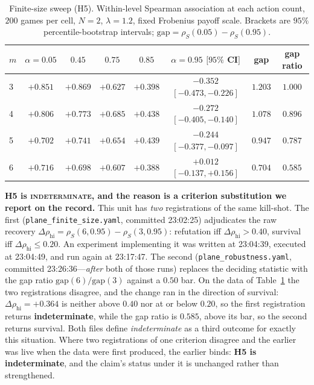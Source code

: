 \begin{table}[H]
\caption{Finite-size sweep (H5). Within-level Spearman association at each action count,
$200$ games per cell, $N=2$, $\lambda=1.2$, fixed Frobenius payoff scale. Brackets are
$95\%$ percentile-bootstrap intervals; $\mathrm{gap}=\rho_S(0.05)-\rho_S(0.95)$.}
\label{tab:finitesize}
\small
\begin{tabular}{lccccccc}
\toprule
$m$ & $\alpha{=}0.05$ & $0.45$ & $0.75$ & $0.85$ & $\alpha{=}0.95$ $[95\%$ CI$]$ & gap & gap ratio \\
\midrule
3 & $+0.851$ & $+0.869$ & $+0.627$ & $+0.398$ & $-0.352$ $[-0.473,-0.226]$ & $1.203$ & $1.000$ \\
4 & $+0.806$ & $+0.773$ & $+0.685$ & $+0.438$ & $-0.272$ $[-0.405,-0.140]$ & $1.078$ & $0.896$ \\
5 & $+0.702$ & $+0.741$ & $+0.654$ & $+0.439$ & $-0.244$ $[-0.377,-0.097]$ & $0.947$ & $0.787$ \\
6 & $+0.716$ & $+0.698$ & $+0.607$ & $+0.388$ & $+0.012$ $[-0.137,+0.156]$ & $0.704$ & $0.585$ \\
\bottomrule
\end{tabular}
\end{table}

\noindent\textbf{H5 is \textsc{indeterminate}, and the reason is a criterion substitution we
report on the record.} This unit has \emph{two} registrations of the same kill-shot. The
first (\texttt{plane\_finite\_size.yaml}, committed 23:02:25) adjudicates the raw recovery
$\Delta\rho_{\mathrm{hi}}=\rho_S(6,0.95)-\rho_S(3,0.95)$: refutation iff
$\Delta\rho_{\mathrm{hi}}>0.40$, survival iff $\Delta\rho_{\mathrm{hi}}\le0.20$. An
experiment implementing it was written at 23:04:39, executed at 23:04:49, and run again at
23:17:47. The second (\texttt{plane\_robustness.yaml}, committed 23:26:36---\emph{after}
both of those runs) replaces the deciding statistic with the gap ratio
$\mathrm{gap}(6)/\mathrm{gap}(3)$ against a $0.50$ bar. On the data of
Table~\ref{tab:finitesize} the two registrations disagree, and the change ran in the
direction of survival: $\Delta\rho_{\mathrm{hi}}=+0.364$ is neither above $0.40$ nor at or
below $0.20$, so the first registration returns \textbf{indeterminate}, while the gap ratio
is $0.585$, above its bar, so the second returns survival. Both files define
\emph{indeterminate} as a third outcome for exactly this situation. Where two registrations
of one criterion disagree and the earlier was live when the data were first produced, the
earlier binds: \textbf{H5 is indeterminate}, and the claim's status under it is unchanged
rather than strengthened.

